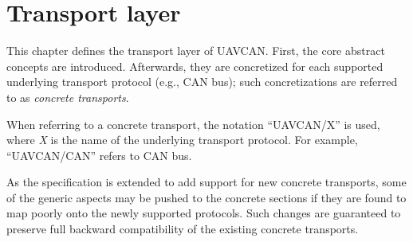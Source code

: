 \chapter{Transport layer}\label{sec:transport_layer}

This chapter defines the transport layer of UAVCAN.
First, the core abstract concepts are introduced.
Afterwards, they are concretized for each supported underlying transport protocol (e.g., CAN bus);
such concretizations are referred to as \emph{concrete transports}.

When referring to a concrete transport, the notation ``UAVCAN/X'' is used,
where \emph{X} is the name of the underlying transport protocol.
For example, ``UAVCAN/CAN'' refers to CAN bus.

As the specification is extended to add support for new concrete transports,
some of the generic aspects may be pushed to the concrete sections
if they are found to map poorly onto the newly supported protocols.
Such changes are guaranteed to preserve full backward compatibility of the existing concrete transports.

\clearpage
\clearpage
